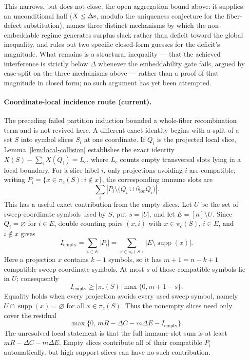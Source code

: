 This narrows, but does not close, the open aggregation bound above: it
supplies an unconditional half ($X\le\Delta\mathrm{s}$, modulo the
uniqueness conjecture for the fiber-defect substitution), names three
distinct mechanisms by which the non-embeddable regime generates
surplus slack rather than deficit toward the global inequality, and
rules out two specific closed-form guesses for the deficit's
magnitude. What remains is a structural inequality --- that the
achieved interference is strictly below $\Delta$ whenever the
embeddability gate fails, argued by case-split on the three mechanisms
above --- rather than a proof of that magnitude in closed form; no such
argument has yet been attempted.

\paragraph{Coordinate-local incidence route (current).}
The preceding failed partition induction bounded a whole-fiber
recombination term and is not revived here.  A different exact identity begins
with a split of a set $S$ into symbol slices $S_i$ at one coordinate.  If
$Q_i$ is the projected local slice, Lemma~\ref{lem:local-collision}
establishes the exact identity $X(S)-\sum_i X(Q_i)=L_c$, where $L_c$
counts empty transversal slots lying in a local boundary.
For a slice label $i$, only projections avoiding $i$ are compatible; writing
$P_i=\{x\in\pi_c(S):i\notin x\}$, the corresponding immune slots are
\[\sum_i\left|P_i\setminus\bigl(Q_i\cup\partial_{\mathrm{loc}}Q_i\bigr)\right|.
\]
This has a useful exact contribution from the empty slices.  Let $U$ be the
set of sweep-coordinate symbols used by $S$, put $s=|U|$, and let
$E=[n]\setminus U$.  Since $Q_i=\varnothing$ for $i\in E$, double counting
pairs $(x,i)$ with $x\in\pi_c(S)$, $i\in E$, and $i\notin x$ gives
\[
 I_{\mathrm{empty}}
 =\sum_{i\in E}|P_i|
 =\sum_{x\in\pi_c(S)}|E\setminus\operatorname{supp}(x)|.
\]
Here a projection $x$ contains $k-1$ symbols, so it has $m+1=n-k+1$
compatible sweep-coordinate symbols.  At most $s$ of those compatible
symbols lie in $U$; consequently
\[
 I_{\mathrm{empty}}
 \ge |\pi_c(S)|\max\{0,m+1-s\}.
\]
Equality holds when every projection avoids every used sweep symbol, namely
$U\cap\operatorname{supp}(x)=\varnothing$ for all $x\in\pi_c(S)$.  Thus the
nonempty slices need only cover the residual
\[
 \max\{0,\,mR-\Delta C-m\Delta E-I_{\mathrm{empty}}\}.
\]
The unresolved local statement is that the full immune-slot sum is at least
$mR-\Delta C-m\Delta E$.  Empty slices contribute all of their compatible
$P_i$ automatically, but high-support slices can have no such contribution.

